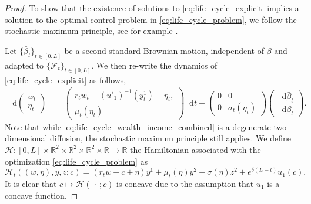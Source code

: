 \documentclass[11pt,oneside,english,reqno,dvipsnames,table]{amsart}
\numberwithin{equation}{section}
\theoremstyle{plain}
\theoremstyle{definition}
\theoremstyle{remark}
\theoremstyle{plain}
\theoremstyle{plain}
\theoremstyle{plain}
\theoremstyle{plain}
\theoremstyle{plain}
\theoremstyle{plain}
\theoremstyle{plain}
\newcommand{\cF}{\mathcal{F}}
\newcommand{\RR}{\mathbb{R}}
\newcommand{\dd}{\mathop{}\!\mathrm{d}}
\newcommand{\mcH}{\mathcal{H}}
\numberwithin{thm}{section}
\begin{document}
%
\begin{proof} To show that the existence of solutions to \eqref{eq:life_cycle_explicit} implies a solution to the optimal control problem in \eqref{eq:life_cycle_problem}, we  follow the stochastic maximum principle, see for example \cite[Thm.~6.4.6]{pham_09_continuous}. %

Let $\{\bar{\beta}_t\}_{t\in [0,L]}$ be a second standard Brownian motion, independent of $\beta$ and adapted to $\{\cF_t\}_{t\in [0,L]}$. 
We then re-write the dynamics of \eqref{eq:life_cycle_explicit} as follows,
%
\begin{equation}\label{eq:life_cycle_wealth_income_combined}
    \begin{aligned}
         \dd \begin{pmatrix}
        w_t 
        \\
        \eta_t
    \end{pmatrix}&= \begin{pmatrix}
            r_tw_t -(u'_1)^{-1}(y^1_t)+\eta_t,  
            \\
            \mu_t(\eta_t)\
            \end{pmatrix}\dd t + \begin{pmatrix}
                0 &0 
                \\
                0 & \sigma_t(\eta_t)
            \end{pmatrix}  \begin{pmatrix}
        \dd \bar{\beta}_t\\
        \dd \beta_t
    \end{pmatrix}. 
    \end{aligned}
\end{equation}
%
Note that while \eqref{eq:life_cycle_wealth_income_combined} is a degenerate two dimensional diffusion, the stochastic maximum principle still applies. We define $\mcH:[0,L]\times \RR^2\times \RR^2 \times \RR^2 \times \RR\rightarrow \RR$ the Hamiltonian associated with the optimization \eqref{eq:life_cycle_problem} as 
%
\begin{equation}\label{eq:hamilton}\mcH_t((w,\eta),y,z;c) = (r_t w -c +\eta) y^1+ \mu_t(\eta)y^2+\sigma(\eta)z^2 + e^{\delta(L-t)} u_1(c).
\end{equation}
It is clear that $c\mapsto \mcH(\,\cdot\,;c)$ is concave due to the assumption that $u_1$ is a concave function.


\end{proof}
\end{document}
